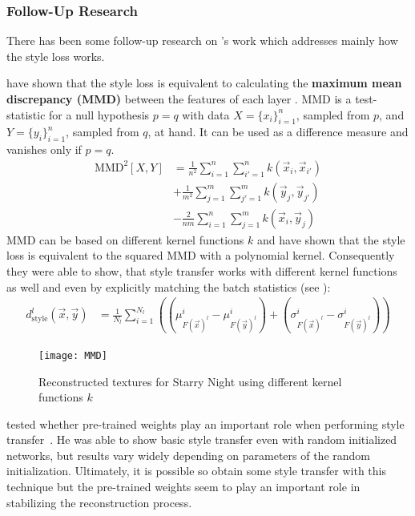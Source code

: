 \subsubsection{Follow-Up Research}
There has been some follow-up research on \citeauthor*{gatys}'s work which addresses mainly how the style loss works.

\citeauthor*{MMD} have shown that the style loss is equivalent to calculating the \textbf{maximum mean discrepancy (MMD)} between the features of each layer \cite{MMD}.
MMD is a test-statistic for a null hypothesis $p=q$ with data $X = \{x_i\}^n_{i=1}$, sampled from $p$, and $Y = \{y_i\}^n_{i=1}$, sampled from $q$, at hand.
It can be used as a difference measure and vanishes only if $p=q$.
\begin{align}
    \text{MMD}^2[X, Y] & = \frac{1}{n^2} \sum^n_{i=1} \sum^n_{i'=1} k(\vec{x}_i, \vec{x}_{i'}) \\
    & + \frac{1}{m^2} \sum^m_{j=1} \sum^m_{j'=1} k(\vec{y}_j, \vec{y}_{j'}) \\
    & - \frac{2}{nm} \sum^n_{i=1} \sum^m_{j=1} k(\vec{x}_i, \vec{y}_{j})
\end{align}
MMD can be based on different kernel functions $k$ and \citeauthor*{MMD} have shown that the style loss is equivalent to the squared MMD with a polynomial kernel.
Consequently they were able to show, that style transfer works with different kernel functions as well and even by explicitly matching the batch statistics (see ):
\begin{align}
    d_{\text{style}}^l(\vec{x}, \vec{y}) & = \frac{1}{N_l} \sum_{i = 1}^{N_l} \left( (\mu^i_{F(\vec{x})^l} - \mu^i_{F(\vec{y})^l}) + (\sigma^i_{F(\vec{x})^l} - \sigma^i_{F(\vec{y})^l}) \right)
\end{align}
\begin{figure}
    \texttt{[image: MMD]}
    \caption{Reconstructed textures for Starry Night using different kernel functions $k$ \cite{MMD}}
\end{figure}

\citeauthor*{lendu} tested whether pre-trained weights play an important role when performing style transfer~\cite{lendu}.
He was able to show basic style transfer even with random initialized networks, but results vary widely depending on parameters of the random initialization.
Ultimately, it is possible so obtain some style transfer with this technique but the pre-trained weights seem to play an important role in stabilizing the reconstruction process.

